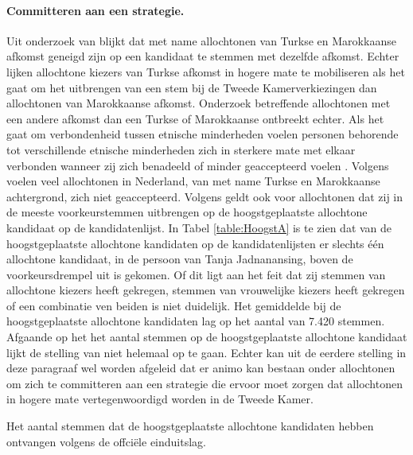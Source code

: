 \paragraph{Committeren aan een strategie.}
Uit onderzoek van \citep{fennema2001civic} blijkt dat met name allochtonen van Turkse en Marokkaanse afkomst geneigd zijn op een kandidaat te stemmen met dezelfde afkomst. Echter lijken allochtone kiezers van Turkse afkomst in hogere mate te mobiliseren als het gaat om het uitbrengen van een stem bij de Tweede Kamerverkiezingen dan allochtonen van Marokkaanse afkomst. Onderzoek betreffende allochtonen met een andere afkomst dan een Turkse of Marokkaanse ontbreekt echter. Als het gaat om verbondenheid tussen etnische minderheden voelen personen behorende tot verschillende etnische minderheden zich in sterkere mate met elkaar verbonden wanneer zij zich benadeeld of minder geaccepteerd voelen \citep{schmitt2002meaning}. Volgens \cite{buijs2006strijders} voelen veel allochtonen in Nederland, van met name Turkse en Marokkaanse achtergrond, zich niet geaccepteerd. Volgens \cite{van2012tweede} geldt ook voor allochtonen dat zij in de meeste voorkeurstemmen uitbrengen op de hoogstgeplaatste allochtone kandidaat op de kandidatenlijst. In Tabel \ref{table:HoogstA} is te zien dat van de hoogstgeplaatste allochtone kandidaten op de kandidatenlijsten er slechts één allochtone kandidaat, in de persoon van Tanja Jadnanansing, boven de voorkeursdrempel uit is gekomen. Of dit ligt aan het feit dat zij stemmen van allochtone kiezers heeft gekregen, stemmen van vrouwelijke kiezers heeft gekregen of een combinatie ven beiden is niet duidelijk. Het gemiddelde bij de hoogstgeplaatste allochtone kandidaten lag op het aantal van 7.420 stemmen. Afgaande op het het aantal stemmen op de hoogstgeplaatste allochtone kandidaat lijkt de stelling van \cite{van2012tweede} niet helemaal op te gaan. Echter kan uit de eerdere stelling in deze paragraaf wel worden afgeleid dat er animo kan bestaan onder allochtonen om zich te committeren aan een strategie die ervoor moet zorgen dat allochtonen in hogere mate vertegenwoordigd worden in de Tweede Kamer. \\

\begin{table}[H]
\centering
	\begin{footnotesize}
		
	\end{footnotesize}
			\caption{Het aantal stemmen dat de hoogstgeplaatste allochtone kandidaten hebben ontvangen volgens de offci\"{e}le einduitslag.}
\label{table:HoogstA} 
\end{table}





